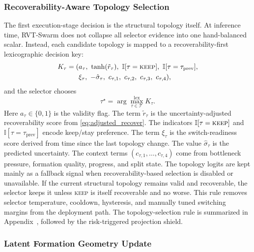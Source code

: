 \documentclass{ieeeaccess}
\newcommand{\cT}{\mathcal{T}}
\begin{document}
\subsubsection{Recoverability-Aware Topology Selection}
\label{sec:selector}

The first execution-stage decision is the structural topology itself.
At inference time, RVT-Swarm does not collapse all selector evidence
into one hand-balanced scalar. Instead, each candidate topology is
mapped to a recoverability-first lexicographic decision key:
\begin{equation}
\begin{aligned}
K_\tau = (&a_\tau,\ \tanh(\tilde r_\tau),\ \mathbb{I}[\tau=\textsc{keep}],\ \mathbb{I}[\tau=\tau_{\mathrm{prev}}], \\
          &\xi_\tau,\ -\hat\sigma_\tau,\ c_{\tau,1},\ c_{\tau,2},\ c_{\tau,3},\ c_{\tau,4}),
\end{aligned}
\label{eq:selector_key}
\end{equation}
and the selector chooses
\begin{equation}
\tau^\star = \arg\max_{\tau \in \cT}^{\mathrm{lex}} K_\tau.
\label{eq:selector_choice}
\end{equation}
Here $a_\tau\in\{0,1\}$ is the validity flag.
The term $\tilde r_\tau$ is the uncertainty-adjusted recoverability
score from \eqref{eq:adjusted_recover}. The indicators
$\mathbb{I}[\tau=\textsc{keep}]$ and
$\mathbb{I}[\tau=\tau_{\mathrm{prev}}]$ encode keep/stay preference.
The term $\xi_\tau$ is the switch-readiness score derived from time
since the last topology change. The value $\hat\sigma_\tau$ is the
predicted uncertainty. The context terms
$(c_{\tau,1},\dots,c_{\tau,4})$ come from bottleneck pressure,
formation quality, progress, and split state. The topology logits are
kept mainly as a fallback signal when recoverability-based selection is
disabled or unavailable. If the current structural topology remains
valid and recoverable, the selector keeps it unless \textsc{keep} is
itself recoverable and no worse. This rule removes selector
temperature, cooldown, hysteresis, and manually tuned switching
margins from the deployment path. The topology-selection rule is
summarized in Appendix~, followed by the
risk-triggered projection shield.

\subsubsection{Latent Formation Geometry Update}
\label{sec:geometry_execution}
\end{document}

